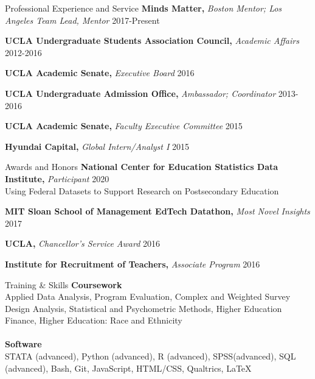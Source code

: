 \documentclass{resume} %
\begin{document}
\begin{rSection}{Professional Experience and Service}
    {{\bf Minds Matter,} \em Boston Mentor; Los Angeles Team Lead, Mentor}
    \hfill {2017-Present}

    {{\bf UCLA Undergraduate Students Association Council,} \em Academic Affairs}
    \hfill {2012-2016}

    {{\bf UCLA Academic Senate,} \em Executive Board}
    \hfill {2016}

    {{\bf UCLA Undergraduate Admission Office,} \em Ambassador; Coordinator}
    \hfill {2013-2016}

    {{\bf UCLA Academic Senate,} \em Faculty Executive Committee}
    \hfill {2015}

    {{\bf Hyundai Capital,} \em Global Intern/Analyst I}
    \hfill {2015}

    \end{rSection}

\begin{rSection}{Awards and Honors} 
    {{\bf National Center for Education Statistics Data Institute,} \em Participant}
    \hfill {2020}
    \\
    Using Federal Datasets to Support Research on Postsecondary Education 

    {{\bf MIT Sloan School of Management EdTech Datathon,} \em Most Novel Insights }
    \hfill {2017}

    {{\bf UCLA,} \em Chancellor’s Service Award }
    \hfill {2016}

    {{\bf Institute for Recruitment of Teachers,} \em Associate Program }
    \hfill {2016}

    \end{rSection}
\begin{rSection}{Training \& Skills}
        {\bf Coursework}
        \\ Applied Data Analysis, Program Evaluation, Complex and Weighted Survey Design Analysis, 
        Statistical and Psychometric Methods, Higher Education Finance, Higher Education: Race and Ethnicity
        \\ \\ {\bf Software}
        \\ STATA (advanced), Python (advanced), R (advanced), SPSS(advanced), SQL (advanced), Bash, Git, JavaScript, HTML/CSS, Qualtrics, \LaTeX
\end{rSection}
\end{document}
